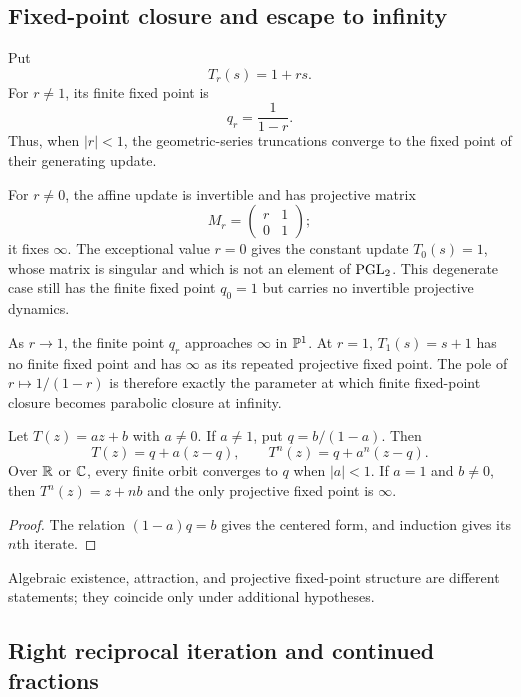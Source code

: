 \subsection{Fixed-point closure and escape to infinity}

Put
\[
  T_r(s)=1+rs.
\]
For $r\ne1$, its finite fixed point is
\begin{equation}\label{eq:p0-geometric-fixed-point}
  q_r=\frac1{1-r}.
\end{equation}
Thus, when $|r|<1$, the geometric-series truncations converge to the fixed
point of their generating update.

For $r\ne0$, the affine update is invertible and has projective matrix
\[
  M_r=\begin{pmatrix}r&1\\0&1\end{pmatrix};
\]
it fixes $\infty$.  The exceptional value $r=0$ gives the constant update
$T_0(s)=1$, whose matrix is singular and which is not an element of
$\operatorname{PGL}_2$.  This degenerate case still has the finite fixed point $q_0=1$ but
carries no invertible projective dynamics.

As $r\to1$, the finite point $q_r$ approaches $\infty$ in $\mathbb{P}^1$.  At
$r=1$, $T_1(s)=s+1$ has no finite fixed point and has $\infty$ as its repeated
projective fixed point.  The pole of $r\mapsto1/(1-r)$ is therefore exactly
the parameter at which finite fixed-point closure becomes parabolic closure at
infinity.

\begin{proposition}
\label{prop:p0-affine-iteration}
Let $T(z)=az+b$ with $a\ne0$.  If $a\ne1$, put
$q=b/(1-a)$.  Then
\begin{equation}\label{eq:p0-affine-centered-form}
  T(z)=q+a(z-q),
  \qquad
  T^n(z)=q+a^n(z-q).
\end{equation}
Over $\mathbb{R}$ or $\mathbb{C}$, every finite orbit converges to $q$ when $|a|<1$.
If $a=1$ and $b\ne0$, then $T^n(z)=z+nb$ and the only projective fixed point
is $\infty$.
\end{proposition}

\begin{proof}
The relation $(1-a)q=b$ gives the centered form, and induction gives its
$n$th iterate.
\end{proof}

Algebraic existence, attraction, and projective fixed-point structure are
different statements; they coincide only under additional hypotheses.

\subsection{Right reciprocal iteration and continued fractions}


